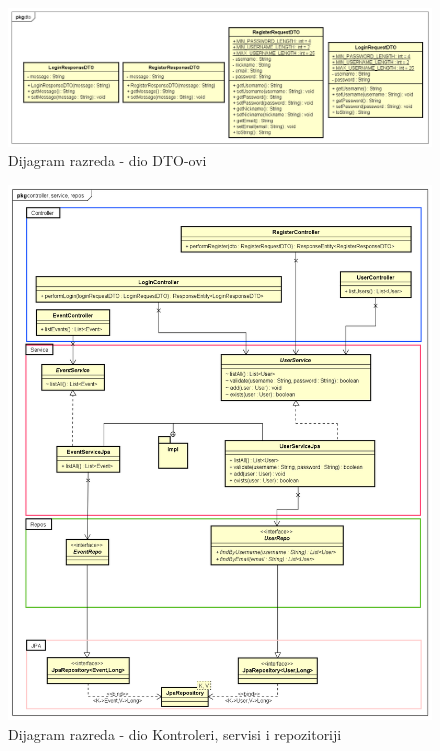 			
			\begin{figure}[h]
				\includegraphics[width=\textwidth]{dijagrami/UML dtoovi.png}
				\caption{Dijagram razreda - dio DTO-ovi}
			\end{figure}
		
		    \begin{figure}[h]
		    	\includegraphics[width=\textwidth]{dijagrami/UML kontroleri, servisi, repozitoriji.png}
		    	\caption{Dijagram razreda - dio Kontroleri, servisi i repozitoriji}
		    \end{figure}
			
